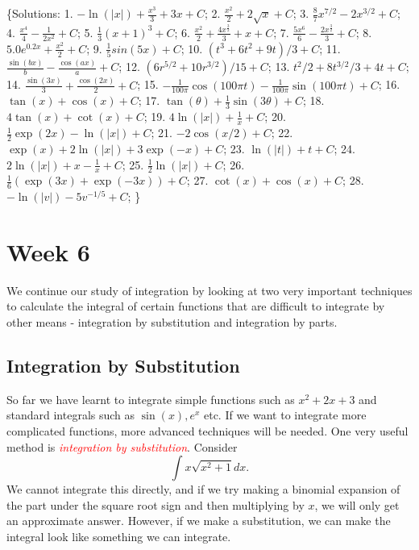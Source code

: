 \documentclass[
  11pt,
  oneside]{book}
\newcommand{\slide}{}
\theoremstyle{definition}
\theoremstyle{definition}
\theoremstyle{definition}
\theoremstyle{definition}
\theoremstyle{remark}
\begin{document}
\{Solutions:
1. \(-\ln(|x|)+{\frac{x^3}{3}}+3x+C\);
2. \({\frac{x^2}{2}}+2\sqrt{x}+C\);
3. \(\frac{8}{7}x^{7/2} - 2x^{3/2}+C\);
4. \({\frac{x^4}{4}}-{\frac{1}{2x^2}}+C\);
5. \(\frac{1}{3}(x+1)^3+C\);
6. \({\frac{x^2}{2}}+\frac{4x^{\frac{3}{2}}}{3}+x+C\);
7. \({\frac{5x^6}{6}}-\frac{2x^{\frac{3}{2}}}{3}+C\);
8. \(5.0e^{0.2x}+\frac{x^2}{2}+C\);
9. \(\frac{1}{5}sin(5x)+C\);
10. \((t^3+6t^2+9t)/3+C\);
11. \(\frac{\sin(bx)}{b}-\frac{\cos(ax)}{a}+C\);
12. \((6r^{5/2}+10r^{3/2})/15+C\);
13. \(t^2/2 + 8t^{3/2}/3+4t+C\);
14. \(\frac{\sin(3x)}{3}+\frac{\cos(2x)}{2}+C\);
15. \(-\frac{1}{100\pi}\cos(100\pi t) - \frac{1}{100\pi}\sin(100\pi t) + C\);
16. \(\tan(x)+\cos(x)+C\);
17. \(\tan(\theta) + \frac{1}{3}\sin(3\theta)+C\);
18. \(4\tan(x) + \cot(x) +C\);
19. \(4\ln(|x|) + \frac{1}{x} +C\);
20. \(\frac{1}{2}\exp(2x)-\ln(|x|) + C\);
21. \(-2\cos(x/2)+C\);
22. \(\exp(x) + 2\ln(|x|) +3\exp(-x)+C\);
23. \(\ln(|t|) + t + C\);
24. \(2\ln(|x|) + x - \frac{1}{x} + C\);
25. \(\frac{1}{2}\ln(|x|)+C\);
26. \(\frac{1}{6}(\exp(3x)+\exp(-3x)) + C\);
27. \(\cot(x)+\cos(x)+C\);
28. \(-\ln(|v|)-5 v^{-1/5}+C\);
\}

\chapter{Week 6}\label{week-six}

We continue our study of integration by looking at two very important techniques to calculate the integral of certain functions that are difficult to integrate by other means - integration by substitution and integration by parts.

\slide

\section{Integration by Substitution}\label{integration-by-substitution}

So far we have learnt to integrate simple functions such as \(x^2 + 2x + 3\) and standard integrals such as \(\sin(x), e^x\) etc. If we want to integrate more complicated functions, more advanced techniques will be needed. One very useful method is \textcolor{red}{\em integration by substitution}. Consider
\[
\int x\sqrt{x^2+1} dx.\tag{1}
\]
We cannot integrate this directly, and if we try making a binomial expansion of the part under the square root sign and then multiplying by \(x\), we will only get an approximate answer. However, if we make a substitution, we can make the integral look like something we can integrate.
\end{document}
